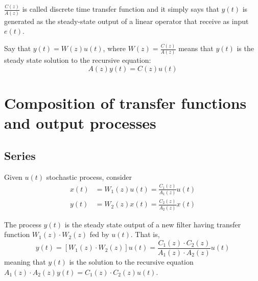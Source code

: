 \documentclass[10pt,a4paper,twoside,openright]{book}
\begin{document}
$\frac{C(z)}{A(z)}$ is called discrete time transfer function and it simply says that $y(t)$ is generated as the steady-state output of a linear operator that receive as input $e(t)$.













































Say that $y(t)=W(z)u(t)$, where $W(z)=\frac{C(z)}{A(z)}$ means that $y(t)$ is the steady state solution to the recursive equation:
\[
	A(z)y(t)=C(z)u(t)
\]

\section{Composition of transfer functions and output processes}
\subsection{Series}
Given $u(t)$ stochastic process, consider
\begin{align*}
	x(t)&=W_{1}(z)u(t)=\frac{C_{1}(z)}{A_{1}(z)}u(t)\\
	y(t)&=W_{2}(z)x(t)=\frac{C_{2}(z)}{A_{2}(z)}x(t)
\end{align*}
\begin{theorem}
	The process $y(t)$ is the steady state output of a new filter having transfer function $W_{1}(z)\cdot W_{2}(z)$ fed by $u(t)$. That is,
	\[
		y(t)=[W_{1}(z)\cdot W_{2}(z)]u(t)=\frac{C_{1}(z)\cdot C_{2}(z)}{A_{1}(z)\cdot A_{2}(z)}u(t)
	\]
	meaning that $y(t)$ is the solution to the recursive equation $A_{1}(z)\cdot A_{2}(z) y(t) = C_{1}(z)\cdot C_{2}(z)u(t)$.
\end{theorem}
\end{document}

